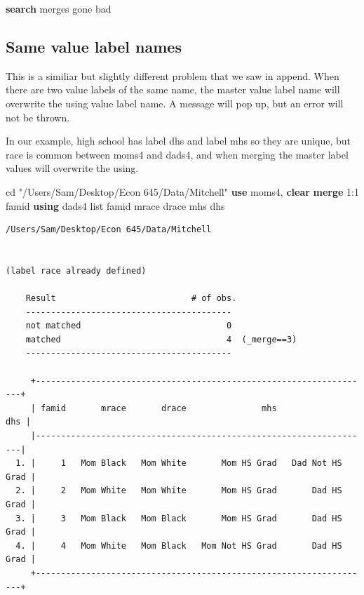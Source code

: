 \documentclass[
]{book}
\newenvironment{Shaded}{\begin{snugshade}}{\end{snugshade}}
\newcommand{\KeywordTok}[1]{\textcolor[rgb]{0.13,0.29,0.53}{\textbf{#1}}}
\newcommand{\NormalTok}[1]{#1}
\newcommand{\OtherTok}[1]{\textcolor[rgb]{0.56,0.35,0.01}{#1}}
\newcommand{\StringTok}[1]{\textcolor[rgb]{0.31,0.60,0.02}{#1}}
\begin{document}
\begin{Shaded}
\begin{Highlighting}[]
\KeywordTok{search}\NormalTok{ merges gone bad}
\end{Highlighting}
\end{Shaded}

\subsection*{Same value label names}\label{same-value-label-names}

This is a similiar but slightly different problem that we saw in append. When there are two value labels of the same name, the master value label name will overwrite the using value label name. A message will pop up, but an error will not be thrown.

In our example, high school has label dhs and label mhs so they are unique, but race is common between moms4 and dads4, and when merging the master label values will overwrite the using.

\begin{Shaded}
\begin{Highlighting}[]
\NormalTok{cd }\StringTok{"/Users/Sam/Desktop/Econ 645/Data/Mitchell"}
\KeywordTok{use}\NormalTok{ moms4, }\KeywordTok{clear}
\KeywordTok{merge}\NormalTok{ 1:1 famid }\KeywordTok{using}\NormalTok{ dads4}
\OtherTok{list}\NormalTok{ famid mrace drace mhs dhs}
\end{Highlighting}
\end{Shaded}

\begin{verbatim}
/Users/Sam/Desktop/Econ 645/Data/Mitchell


(label race already defined)

    Result                           # of obs.
    -----------------------------------------
    not matched                             0
    matched                                 4  (_merge==3)
    -----------------------------------------

     +-------------------------------------------------------------------+
     | famid       mrace       drace               mhs               dhs |
     |-------------------------------------------------------------------|
  1. |     1   Mom Black   Mom White       Mom HS Grad   Dad Not HS Grad |
  2. |     2   Mom White   Mom White       Mom HS Grad       Dad HS Grad |
  3. |     3   Mom Black   Mom Black       Mom HS Grad       Dad HS Grad |
  4. |     4   Mom White   Mom Black   Mom Not HS Grad       Dad HS Grad |
     +-------------------------------------------------------------------+
\end{verbatim}
\end{document}
